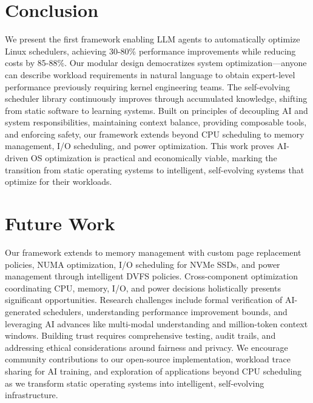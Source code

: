\section{Conclusion}

We present the first framework enabling LLM agents to automatically optimize Linux schedulers, achieving 30-80\% performance improvements while reducing costs by 85-88\%. Our modular design democratizes system optimization—anyone can describe workload requirements in natural language to obtain expert-level performance previously requiring kernel engineering teams. The self-evolving scheduler library continuously improves through accumulated knowledge, shifting from static software to learning systems. Built on principles of decoupling AI and system responsibilities, maintaining context balance, providing composable tools, and enforcing safety, our framework extends beyond CPU scheduling to memory management, I/O scheduling, and power optimization. This work proves AI-driven OS optimization is practical and economically viable, marking the transition from static operating systems to intelligent, self-evolving systems that optimize for their workloads.

\section{Future Work}

Our framework extends to memory management with custom page replacement policies, NUMA optimization, I/O scheduling for NVMe SSDs, and power management through intelligent DVFS policies. Cross-component optimization coordinating CPU, memory, I/O, and power decisions holistically presents significant opportunities. Research challenges include formal verification of AI-generated schedulers, understanding performance improvement bounds, and leveraging AI advances like multi-modal understanding and million-token context windows. Building trust requires comprehensive testing, audit trails, and addressing ethical considerations around fairness and privacy. We encourage community contributions to our open-source implementation, workload trace sharing for AI training, and exploration of applications beyond CPU scheduling as we transform static operating systems into intelligent, self-evolving infrastructure.